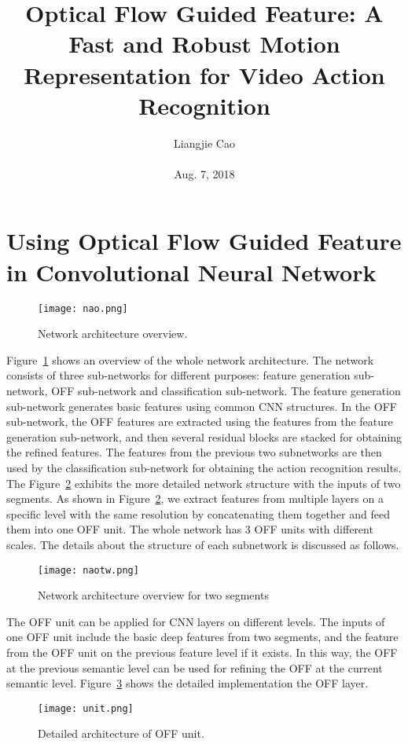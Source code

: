 \documentclass[10pt,twocolumn,letterpaper]{article}
\begin{document}
\title{\textbf{Optical Flow Guided Feature: A Fast and Robust Motion Representation for Video Action Recognition}}
\author{Liangjie Cao\\\\ Aug. 7, 2018}
\maketitle
\section{Using Optical Flow Guided Feature in Convolutional Neural Network}
 \begin{figure}[!htb]
  \centering
  \texttt{[image: nao.png]}\\
 \caption{Network architecture overview.}\label{Figure1} 
  \end{figure}
Figure~\ref{Figure1} shows an
overview of the whole network architecture. The network consists of three sub-networks for different purposes: feature generation sub-network, OFF sub-network and classification sub-network. The feature generation sub-network generates basic features using common CNN structures. In
the OFF sub-network, the OFF features are extracted using the features from the feature generation sub-network, and
then several residual blocks are stacked for obtaining the refined features. The features from the previous two subnetworks are then used by the classification sub-network for obtaining the action recognition results. The Figure~\ref{Figure2} exhibits the more detailed network structure with the inputs of two segments. As shown in Figure~\ref{Figure2}, we extract features from multiple layers on a specific level with the same resolution by concatenating them together and feed them into
one OFF unit. The whole network has 3 OFF units with different scales. The details about the structure of each subnetwork is discussed as follows.
\begin{figure}[!htb]
	\centering
	\texttt{[image: naotw.png]}\\
	\caption{Network architecture overview for two segments}\label{Figure2} 
\end{figure}
\par The OFF unit can be applied for CNN layers on different levels. The inputs of one OFF unit include the basic deep features from two segments, and the feature from the OFF unit on the previous feature level if it exists. In this way, the OFF at the previous semantic level can be used for refining the OFF at the current semantic level. Figure~\ref{Figure3} shows the detailed
implementation the OFF layer.
\begin{figure}[!htb]
	\centering
	\texttt{[image: unit.png]}\\
	\caption{Detailed architecture of OFF unit.}\label{Figure3} 
\end{figure}
\end{document}
